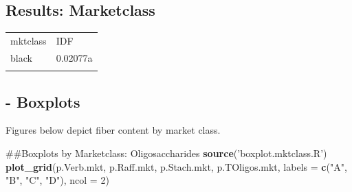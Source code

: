 \documentclass[11pt,]{article}
\newenvironment{Shaded}{\begin{snugshade}}{\end{snugshade}}
\newcommand{\KeywordTok}[1]{\textcolor[rgb]{0.13,0.29,0.53}{\textbf{{#1}}}}
\newcommand{\DataTypeTok}[1]{\textcolor[rgb]{0.13,0.29,0.53}{{#1}}}
\newcommand{\DecValTok}[1]{\textcolor[rgb]{0.00,0.00,0.81}{{#1}}}
\newcommand{\StringTok}[1]{\textcolor[rgb]{0.31,0.60,0.02}{{#1}}}
\newcommand{\NormalTok}[1]{{#1}}
\begin{document}
\subsection{Results: Marketclass}\label{results-marketclass}

\begin{longtable}[c]{@{}ll@{}}
\toprule\addlinespace
mktclass & IDF
\\\addlinespace
\midrule\endhead
black & 0.02077a
\\\addlinespace
\bottomrule
\end{longtable}

\subsection{- Boxplots}\label{boxplots}

Figures below depict fiber content by market class.

\begin{Shaded}
\begin{Highlighting}[]
\NormalTok{##Boxplots by Marketclass: Oligosaccharides}
\KeywordTok{source}\NormalTok{(}\StringTok{'boxplot.mktclass.R'}\NormalTok{)}
\KeywordTok{plot_grid}\NormalTok{(p.Verb.mkt, p.Raff.mkt, p.Stach.mkt, p.TOligos.mkt, }\DataTypeTok{labels =} \KeywordTok{c}\NormalTok{(}\StringTok{"A"}\NormalTok{, }\StringTok{"B"}\NormalTok{, }\StringTok{"C"}\NormalTok{, }\StringTok{"D"}\NormalTok{), }\DataTypeTok{ncol =} \DecValTok{2}\NormalTok{)}
\end{Highlighting}
\end{Shaded}
\end{document}
